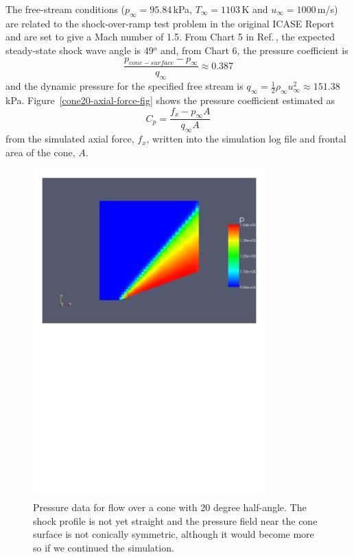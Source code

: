 \medskip
The free-stream conditions ($p_{\infty} = 95.84$\,kPa, $T_{\infty} = 1103$\,K
and $u_{\infty} = 1000$\,m/s) are related to the shock-over-ramp test problem
in the original ICASE Report\,\cite{jacobs_91d} and are set to give a 
Mach number of 1.5.
From Chart 5 in Ref.\,\cite{ames_53}, the expected steady-state shock wave
angle is 49$^o$ and, from Chart 6, the pressure coefficient is
$$
\frac{p_{cone-surface} - p_{\infty}}{q_{\infty}} \approx 0.387
$$
and the dynamic pressure for the specified free stream is
$q_{\infty} = \frac{1}{2} \rho_{\infty} u_{\infty}^2 \approx 151.38$\,kPa.
Figure~\ref{cone20-axial-force-fig} shows the pressure coefficient 
estimated as
$$
C_p = \frac{f_x - p_{\infty} A}{q_{\infty} A}
$$
from the simulated axial force, $f_x$, written into the simulation log file
and frontal area of the cone, $A$.

\begin{figure}[htbp]
\begin{center}
\includegraphics[width=0.8\textwidth, viewport=24 447 571 819]{../2D/cone20-simple/cone20_p.pdf}
\end{center}
\caption{Pressure data for flow over a cone with 20 degree half-angle.
         The shock profile is not yet straight and the pressure field
         near the cone surface is not conically symmetric, although it
	 would become more so if we continued the simulation.}
\label{cone20-pressure-fig}
\end{figure}

